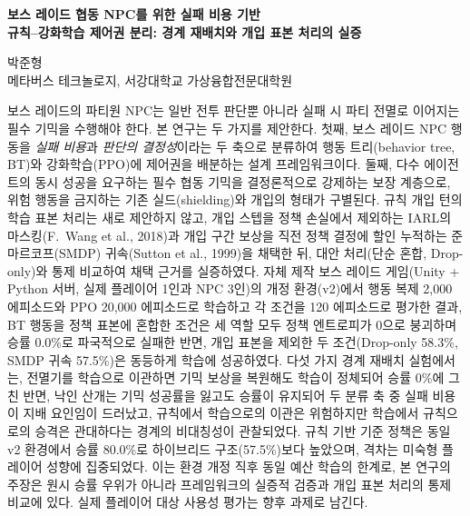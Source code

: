 \documentclass[12pt]{article}      %
\begin{document}
\thispagestyle{fancy}
\begin{center}
\vspace*{3\baselineskip}
{\bfseries 보스 레이드 협동 NPC를 위한 실패 비용 기반\\
규칙--강화학습 제어권 분리: 경계 재배치와 개입 표본 처리의 실증}

\vspace{2\baselineskip}

박준형\\
메타버스 테크놀로지, 서강대학교 가상융합전문대학원\\
\end{center}

\vspace{2\baselineskip}


\noindent 보스 레이드의 파티원 NPC는 일반 전투 판단뿐 아니라 실패 시 파티 전멸로
이어지는 필수 기믹을 수행해야 한다. 본 연구는 두 가지를 제안한다. 첫째, 보스
레이드 NPC 행동을 \emph{실패 비용}과 \emph{판단의 결정성}이라는 두 축으로
분류하여 행동 트리(behavior tree, BT)와 강화학습(PPO)에 제어권을 배분하는 설계
프레임워크이다. 둘째, 다수 에이전트의 동시 성공을 요구하는 필수 협동 기믹을
결정론적으로 강제하는 보장 계층으로, 위험 행동을 금지하는 기존
실드(shielding)와 개입의 형태가 구별된다. 규칙 개입 턴의 학습 표본 처리는 새로
제안하지 않고, 개입 스텝을 정책 손실에서 제외하는 IARL의 마스킹(F.~Wang et al.,
2018)과 개입 구간 보상을 직전 정책 결정에 할인 누적하는 준마르코프(SMDP)
귀속(Sutton et al., 1999)을 채택한 뒤, 대안 처리(단순 혼합, Drop-only)와 통제
비교하여 채택 근거를 실증하였다. 자체 제작 보스 레이드 게임(Unity + Python
서버, 실제 플레이어 1인과 NPC 3인)의 개정 환경(v2)에서 행동 복제 2{,}000
에피소드와 PPO 20{,}000 에피소드로 학습하고 각 조건을 120 에피소드로 평가한
결과, BT 행동을 정책 표본에 혼합한 조건은 세 역할 모두 정책 엔트로피가 0으로
붕괴하며 승률 0.0\%로 파국적으로 실패한 반면, 개입 표본을 제외한 두
조건(Drop-only 58.3\%, SMDP 귀속 57.5\%)은 동등하게 학습에 성공하였다. 다섯
가지 경계 재배치 실험에서는, 전멸기를 학습으로 이관하면 기믹 보상을 복원해도
학습이 정체되어 승률 0\%에 그친 반면, 낙인 산개는 기믹 성공률을 잃고도 승률이
유지되어 두 분류 축 중 실패 비용이 지배 요인임이 드러났고, 규칙에서 학습으로의
이관은 위험하지만 학습에서 규칙으로의 승격은 관대하다는 경계의 비대칭성이
관찰되었다. 규칙 기반 기준 정책은 동일 v2 환경에서 승률 80.0\%로 하이브리드
구조(57.5\%)보다 높았으며, 격차는 미숙형 플레이어 성향에 집중되었다. 이는 환경
개정 직후 동일 예산 학습의 한계로, 본 연구의 주장은 원시 승률 우위가 아니라
프레임워크의 실증적 검증과 개입 표본 처리의 통제 비교에 있다. 실제 플레이어
대상 사용성 평가는 향후 과제로 남긴다.
\end{document}
